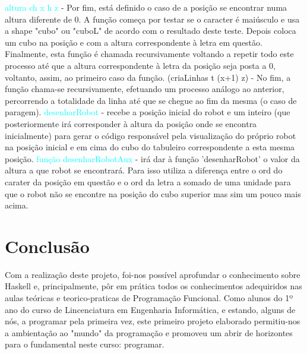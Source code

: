 \documentclass[12pt,a4paper]{article}
\begin{document}
\indent \textcolor{cyan}{altura ch x h z} - Por fim, está definido o caso de a posi\c{c}ão se encontrar numa altura diferente de 0. A fun\c{c}ão começa por testar se o caracter é maiúsculo e usa a shape "cubo" ou "cuboL" de acordo com o resultado deste teste. Depois coloca um cubo na posi\c{c}ão e com a altura correspondente à letra em questão. Finalmente, esta fun\c{c}ão é chamada recursivamente voltando a repetir todo este processo até que a altura correspondente à letra da posi\c{c}ão seja posta a 0, voltanto, assim, ao primeiro caso da fun\c{c}ão.
{(criaLinhas t (x+1) z)} - No fim, a fun\c{c}ão chama-se recursivamente, efetuando um processo análogo ao anterior, percorrendo a totalidade da linha até que se chegue ao fim da mesma (o caso de paragem).
\newline \indent \textcolor{cyan}{desenharRobot} - recebe a posição inicial do robot e um inteiro (que posteriormente irá corresponder à altura da posição onde se encontra inicialmente) para gerar o código responsável pela visualização do próprio robot na posição inicial e em cima do cubo do tabuleiro correspondente a esta mesma posição.
\newline \indent \textcolor{cyan}{função desenharRobotAux} - irá dar à função 'desenharRobot' o valor da altura a que robot se encontrará. Para isso utiliza a diferença entre o ord do carater da posição em questão e o ord da letra a somado de uma unidade para que o robot não se encontre na posição do cubo superior mas sim um pouco mais acima.

\newpage
\section{Conclusão}
\textsf{ \indent Com a realiza\c{c}ão deste projeto, foi-nos possível aprofundar o conhecimento sobre Haskell e, principalmente, pôr em prática todos os conhecimentos adequiridos nas aulas teóricas e teorico-praticas de Programa\c{c}ão Funcional.  
\newline \indent Como alunos do 1º ano do curso de Lincenciatura em Engenharia Informática, e estando, alguns de nós, a programar pela primeira vez, este primeiro projeto elaborado permitiu-nos a ambienta\c{c}ão ao "mundo" da programa\c{c}ão e promoveu um abrir de horizontes para o fundamental neste curso: programar.}
\end{document}
